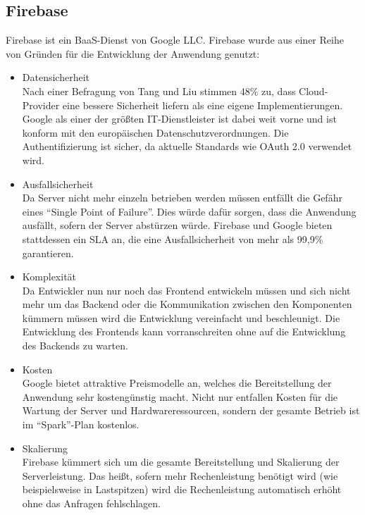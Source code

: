 \subsection{Firebase}
Firebase ist ein \ac{BaaS}-Dienst von Google LLC.
Firebase wurde aus einer Reihe von Gründen für die Entwicklung der Anwendung genutzt:
\begin{itemize}
    \item Datensicherheit\\
        Nach einer Befragung von Tang und Liu stimmen 48\% zu, dass Cloud-Provider eine bessere Sicherheit liefern als eine eigene Implementierungen.\autocite[S. 63]{TANG}
        Google als einer der größten IT-Dienstleister ist dabei weit vorne und ist konform mit den europäischen Datenschutzverordnungen.\autocite{firebaseDataprotection}
        Die Authentifizierung ist sicher, da aktuelle Standards wie OAuth 2.0 verwendet wird.
    \item Ausfallsicherheit\\
        Da Server nicht mehr einzeln betrieben werden müssen entfällt die Gefähr eines \enquote{Single Point of Failure}. %
        Dies würde dafür sorgen, dass die Anwendung ausfällt, sofern der Server abstürzen würde.
        Firebase und Google bieten stattdessen ein \ac{SLA} an, die eine Ausfallsicherheit von mehr als 99,9\% garantieren.\autocite{firebaseSLA}
    \item Komplexität\\
        Da Entwickler nun nur noch das Frontend entwickeln müssen und sich nicht mehr um das Backend oder die Kommunikation zwischen den Komponenten kümmern müssen wird die Entwicklung vereinfacht und beschleunigt.
        Die Entwicklung des Frontends kann vorranschreiten ohne auf die Entwicklung des Backends zu warten.
    \item Kosten \\
        Google bietet attraktive Preismodelle an, welches die Bereitstellung der Anwendung sehr kostengünstig macht.
        Nicht nur entfallen Kosten für die Wartung der Server und Hardwareressourcen, sondern der gesamte Betrieb ist im \enquote{Spark}-Plan kostenlos.
    \item Skalierung \\
        Firebase kümmert sich um die gesamte Bereitstellung und Skalierung der Serverleistung.
        Das heißt, sofern mehr Rechenleistung benötigt wird (wie beispielsweise in Lastspitzen) wird die Rechenleistung automatisch erhöht ohne das Anfragen fehlschlagen.
\end{itemize}



